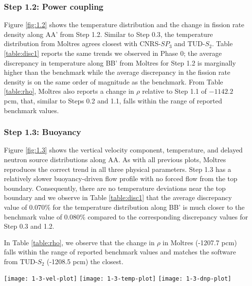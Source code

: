 \subsubsection{Step 1.2: Power coupling}

Figure \ref{fig:1.2} shows the temperature distribution and the change in
fission rate density along AA' from Step 1.2. Similar to Step 0.3, the
temperature distribution from Moltres agrees closest with CNRS-$SP_3$ and
TUD-$S_2$. Table \ref{table:disc1} reports the same trends we observed in Phase
0; the average discrepancy in temperature along BB' from Moltres for Step 1.2
is marginally higher than the benchmark while the average discrepancy in the
fission rate density is on the same order of magnitude as the benchmark.
From Table \ref{table:rho}, Moltres also reports a change in $\rho$
relative to Step 1.1 of $-1142.2$ pcm, that, similar to Steps 0.2 and 1.1,
falls within the range of reported benchmark values.

\subsubsection{Step 1.3: Buoyancy}

Figure \ref{fig:1.3} shows the vertical velocity component, temperature, and
delayed neutron source distributions along AA. As with all previous plots,
Moltres reproduces the correct trend in all three physical
parameters. Step 1.3 has a relatively slower buoyancy-driven flow profile with
no forced flow from the top boundary. Consequently, there are no temperature
deviations near the top boundary and we observe in Table \ref{table:disc1} that
the average discrepancy value of 0.070\% for the temperature distribution along
BB' is much closer to the benchmark value of 0.080\% compared to the
corresponding discrepancy values for Step 0.3 and 1.2.

In Table \ref{table:rho}, we observe that the change in $\rho$ in
Moltres (-1207.7 pcm) falls within the range of reported benchmark values and
matches the software from TUD-$S_2$ (-1208.5 pcm) the closest.
%
\begin{figure*}[tb]
	\centering
	\texttt{[image: 1-3-vel-plot]}
	\texttt{[image: 1-3-temp-plot]}
	\texttt{[image: 1-3-dnp-plot]}
	\caption{Step 1.3 - Vertical velocity component, temperature distribution,
	and delayed neutron source along AA'.}
	\label{fig:1.3}
\end{figure*}

